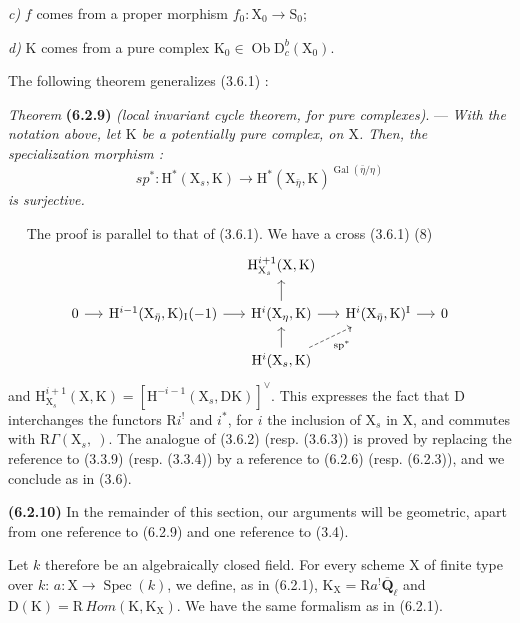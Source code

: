 \documentclass[11pt,leqno]{article}
\newcommand{\Page}[1]{\ifvmode\noindent\else\unskip\ \fi{\footnotesize\textcolor{gray}{[p.\,#1]}}\ \ignorespaces}
\begin{document}
\textit{c)} \(f\) comes from a proper morphism
\(f_0:\mathrm{X}_0\to\mathrm{S}_0\);

\textit{d)} \(\mathrm{K}\) comes from a pure complex
\(\mathrm{K}_0\in\operatorname{Ob}\mathrm{D}_c^b(\mathrm{X}_0)\).

The following theorem generalizes (3.6.1) :

\textit{Theorem} \textbf{(6.2.9)}
\textit{(local invariant cycle theorem, for pure complexes)}.
— \textit{With the notation above, let \(\mathrm{K}\) be a
potentially pure complex, on \(\mathrm{X}\). Then, the specialization
morphism :}
\[
\mathit{sp}^*:\mathrm{H}^*(\mathrm{X}_s,\mathrm{K})
\to\mathrm{H}^*(\mathrm{X}_{\bar{\eta}},\mathrm{K})^{
\operatorname{Gal}(\bar{\eta}/\eta)}
\]
\textit{is surjective.}

\Page{249}
The proof is parallel to that of (3.6.1). We have a cross (3.6.1) (8)
\[
\begin{tikzcd}[column sep=1.3em, row sep=1.5em]
& & \mathrm{H}^{i+1}_{\mathrm{X}_s}(\mathrm{X},\mathrm{K}) & & \\
0 \arrow[r]
& \mathrm{H}^{i-1}(\mathrm{X}_{\bar{\eta}},\mathrm{K})_{\mathrm{I}}(-1) \arrow[r]
& \mathrm{H}^{i}(\mathrm{X}_{\eta},\mathrm{K}) \arrow[u] \arrow[r]
& \mathrm{H}^{i}(\mathrm{X}_{\bar{\eta}},\mathrm{K})^{\mathrm{I}} \arrow[r]
& 0 \\
& & \mathrm{H}^{i}(\mathrm{X}_s,\mathrm{K})
    \arrow[u]
    \arrow[ur, dashed, "\mathrm{sp}^{*}"']
& &
\end{tikzcd}
\]
and \(\mathrm{H}^{i+1}_{\mathrm{X}_s}(\mathrm{X},\mathrm{K})
=[\mathrm{H}^{-i-1}(\mathrm{X}_s,\mathrm{DK})]^{\vee}\).
This expresses the fact that \(\mathrm{D}\) interchanges the functors \(\mathrm{R}i^!\) and \(i^*\), for \(i\) the inclusion of \(\mathrm{X}_s\) in \(\mathrm{X}\), and commutes with \(\mathrm{R}\Gamma(\mathrm{X}_s,\ )\). The analogue of (3.6.2) (resp. (3.6.3)) is proved by replacing the reference to (3.3.9) (resp. (3.3.4)) by a reference to (6.2.6) (resp. (6.2.3)), and we conclude as in (3.6).

\textbf{(6.2.10)} In the remainder of this section, our arguments will be geometric, apart from one reference to (6.2.9) and one reference to (3.4).

Let \(k\) therefore be an algebraically closed field. For every scheme \(\mathrm{X}\) of finite type over \(k\): \(a:\mathrm{X}\to\operatorname{Spec}(k)\), we define, as in (6.2.1), \(\mathrm{K}_{\mathrm{X}}=\mathrm{R}a^!\overline{\mathbf{Q}}_{\ell}\) and \(\mathrm{D}(\mathrm{K})=\mathrm{R}\,\mathit{Hom}(\mathrm{K},\mathrm{K}_{\mathrm{X}})\). We have the same formalism as in (6.2.1).
\end{document}
